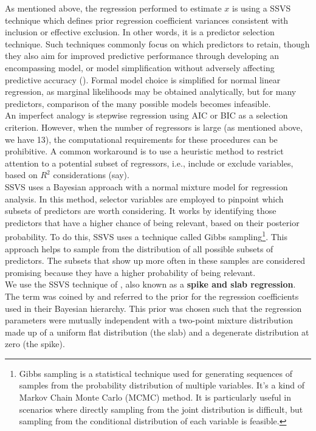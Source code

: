 \documentclass[11pt]{article}
\begin{document}
As mentioned above, the regression performed to estimate $x$ is using a SSVS technique which defines prior regression coefficient variances consistent with inclusion or effective exclusion. In other words, it is a predictor selection technique. Such techniques commonly focus on which predictors to retain, though they also aim for improved predictive performance through developing an encompassing model, or model simplification without adversely affecting predictive accuracy (\cite{piironen_vehtari}).  Formal model choice is simplified for normal linear regression, as marginal likelihoods may be obtained analytically, but for many predictors, comparison of the many possible models becomes infeasible. \\

An imperfect analogy is stepwise regression using AIC or BIC as a selection criterion. However, when the number of regressors is large (as mentioned above, we have 13), the computational requirements for these procedures can be prohibitive. A common workaround is to use a heuristic method to restrict attention to a potential subset of regressors, i.e., include or exclude variables, based on $R^2$ considerations (say). \\

SSVS uses a Bayesian approach with a normal mixture model for regression analysis. In this method, selector variables are employed to pinpoint which subsets of predictors are worth considering. It works by identifying those predictors that have a higher chance of being relevant, based on their posterior probability. To do this, SSVS uses a technique called Gibbs sampling\footnote{Gibbs sampling is a statistical technique used for generating sequences of samples from the probability distribution of multiple variables. It's a kind of Markov Chain Monte Carlo (MCMC) method. It is particularly useful in scenarios where directly sampling from the joint distribution is difficult, but sampling from the conditional distribution of each variable is feasible.}. This approach helps to sample from the distribution of all possible subsets of predictors. The subsets that show up more often in these samples are considered promising because they have a higher probability of being relevant. \\

We use the SSVS technique of \cite{george_and_mcculloch}, also known as a \textbf{spike and slab regression}. The term was coined by \cite{mitchell_beauchamp} and referred to the prior for the regression coefficients used in their Bayesian hierarchy. This prior was chosen such that the regression parameters were mutually independent with a two-point mixture distribution made up of a uniform flat distribution (the slab) and a degenerate distribution at zero (the spike). \\
\end{document}
